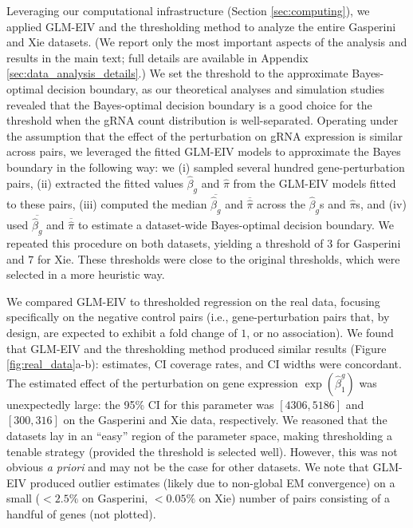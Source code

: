 \documentclass[11pt]{article}
\begin{document}
Leveraging our computational infrastructure (Section \ref{sec:computing}), we applied GLM-EIV and the thresholding method to analyze the entire Gasperini and Xie datasets. (We report only the most important aspects of the analysis and results in the main text; full details are available in Appendix \ref{sec:data_analysis_details}.) We set the threshold to the approximate Bayes-optimal decision boundary, as our theoretical analyses and simulation studies revealed that the Bayes-optimal decision boundary is a good choice for the threshold when the gRNA count distribution is well-separated. Operating under the assumption that the effect of the perturbation on gRNA expression is similar across pairs, we leveraged the fitted GLM-EIV models to approximate the Bayes boundary in the following way: we (i) sampled several hundred gene-perturbation pairs, (ii) extracted the fitted values $\hat{\beta}_g$ and $\hat{\pi}$ from the GLM-EIV models fitted to these pairs, (iii) computed the median $\overline{\hat{\beta}_g}$ and $\overline{\hat{\pi}}$ across the $\hat{\beta}_g$s and $\hat{\pi}$s, and (iv) used $\overline{\hat{\beta}_g}$ and $\overline{\hat{\pi}}$ to estimate a dataset-wide Bayes-optimal decision boundary. We repeated this procedure on both datasets, yielding a threshold of $3$ for Gasperini and $7$ for Xie. These thresholds were close to the original thresholds, which were selected in a more heuristic way.

We compared GLM-EIV to thresholded regression on the real data, focusing specifically on the negative control pairs (i.e., gene-perturbation pairs that, by design, are expected to exhibit a fold change of $1$, or no association). We found that GLM-EIV and the thresholding method produced similar results (Figure \ref{fig:real_data}a-b): estimates, CI coverage rates, and CI widths were concordant. The estimated effect of the perturbation on gene expression $\exp(\hat{\beta}_1^g)$ was unexpectedly large: the 95\% CI for this parameter was $[4306, 5186]$ and $[300, 316]$ on the Gasperini and Xie data, respectively. We reasoned that the datasets lay in an ``easy'' region of the parameter space, making thresholding a tenable strategy (provided the threshold is selected well). However, this was not obvious \textit{a priori} and may not be the case for other datasets. We note that GLM-EIV produced outlier estimates (likely due to non-global EM convergence) on a small ($< 2.5 \%$ on Gasperini, $<0.05\%$ on Xie) number of pairs consisting of a handful of genes (not plotted).
\end{document}
